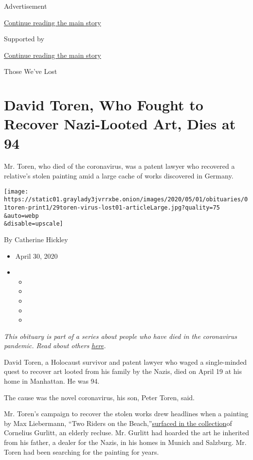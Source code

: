 Advertisement

\protect\hyperlink{after-top}{Continue reading the main story}

Supported by

\protect\hyperlink{after-sponsor}{Continue reading the main story}

Those We've Lost

\hypertarget{david-toren-who-fought-to-recover-nazi-looted-art-dies-at-94}{%
\section{David Toren, Who Fought to Recover Nazi-Looted Art, Dies at
94}\label{david-toren-who-fought-to-recover-nazi-looted-art-dies-at-94}}

Mr. Toren, who died of the coronavirus, was a patent lawyer who
recovered a relative's stolen painting amid a large cache of works
discovered in Germany.

\texttt{[image: https://static01.graylady3jvrrxbe.onion/images/2020/05/01/obituaries/01toren-print1/29toren-virus-lost01-articleLarge.jpg?quality=75\\\&auto=webp\\\&disable=upscale]}

By Catherine Hickley

\begin{itemize}
\item
  April 30, 2020
\item
  \begin{itemize}
  \item
  \item
  \item
  \item
  \item
  \end{itemize}
\end{itemize}

\emph{This obituary is part of a series about people who have died in
the coronavirus pandemic. Read about others}
\href{https://www.nytimes3xbfgragh.onion/series/people-who-have-died-of-the-coronavirus}{\emph{here}}\emph{.}

David Toren, a Holocaust survivor and patent lawyer who waged a
single-minded quest to recover art looted from his family by the Nazis,
died on April 19 at his home in Manhattan. He was 94.

The cause was the novel coronavirus, his son, Peter Toren, said.

Mr. Toren's campaign to recover the stolen works drew headlines when a
painting by Max Liebermann, ``Two Riders on the
Beach,''\href{https://www.nytimes3xbfgragh.onion/2014/08/18/arts/design/experts-say-a-second-work-in-munich-was-looted.html}{surfaced
in the collection}of Cornelius Gurlitt, an elderly recluse. Mr. Gurlitt
had hoarded the art he inherited from his father, a dealer for the
Nazis, in his homes in Munich and Salzburg. Mr. Toren had been searching
for the painting for years.

